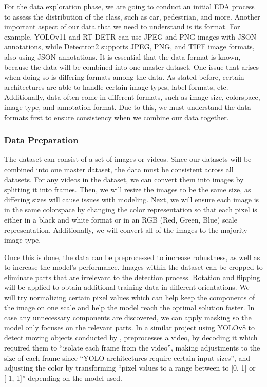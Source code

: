 \documentclass[stu,12pt,floatsintext]{apa7}
\begin{document}
For the data exploration phase, we are going to conduct an initial EDA process to assess the distribution of the class, such as car, pedestrian, and more. Another important aspect of our data that we need to understand is its format. For example, YOLOv11 and RT-DETR can use JPEG and PNG images with JSON annotations, while Detectron2 supports JPEG, PNG, and TIFF image formats, also using JSON annotations. It is essential that the data format is known, because the data will be combined into one master dataset. One issue that arises when doing so is differing formats among the data. As stated before, certain architectures are able to handle certain image types, label formats, etc. Additionally, data often come in different formats, such as image size, colorspace, image type, and annotation format. Due to this, we must understand the data formats first to ensure consistency when we combine our data together.


\subsubsection{Data Preparation}
The dataset can consist of a set of images or videos. Since our datasets will be combined into one master dataset, the data must be consistent across all datasets. For any videos in the dataset, we can convert them into images by splitting it into frames. Then, we will resize the images to be the same size, as differing sizes will cause issues with modeling. Next, we will ensure each image is in the same colorspace by changing the color representation so that each pixel is either in a black and white format or in an RGB (Red, Green, Blue) scale representation. Additionally, we will convert all of the images to the majority image type.

Once this is done, the data can be preprocessed to increase robustness, as well as to increase the model's performance.
Images within the dataset can be cropped to eliminate parts that are irrelevant to the detection process. Rotation and flipping will be applied to obtain additional training data in different orientations. We will try normalizing certain pixel values which can help keep the components of the image on one scale and help the model reach the optimal solution faster. In case any unnecessary components are discovered, we can apply masking so the model only focuses on the relevant parts. In a similar project using YOLOv8 to detect moving objects conducted by \textcite{safaldin_improved_2024}, preprocesses a video, by decoding it which required them to ``isolate each frame from the video'', making adjustments to the size of each frame since ``YOLO architectures require certain input sizes'', and adjusting the color by transforming ``pixel values to a range between to [0, 1] or [-1, 1]'' depending on the model used.
\end{document}
